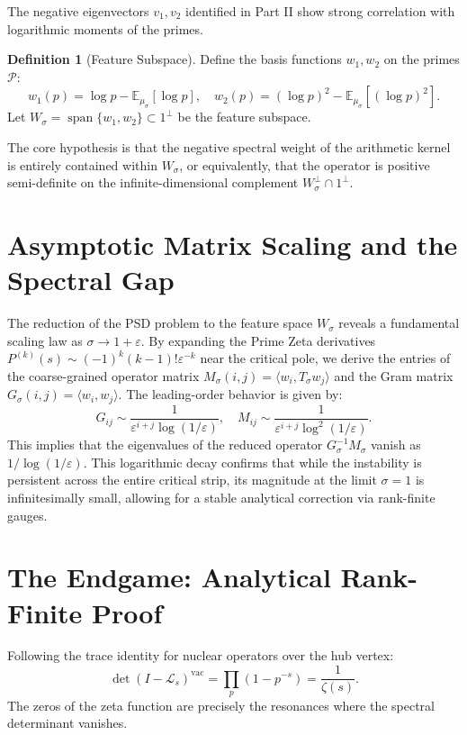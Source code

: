 \documentclass[12pt,a4paper]{article}
\theoremstyle{definition}
\newtheorem{definition}[theorem]{Definition}
\theoremstyle{remark}
\newcommand{\EE}{\mathbb{E}}
\newcommand{\muG}{\mu_\sigma}
\begin{document}
The negative eigenvectors $v_1, v_2$ identified in Part II show strong correlation with logarithmic moments of the primes. 

\begin{definition}[Feature Subspace]
Define the basis functions $w_1, w_2$ on the primes $\mathcal{P}$:
\[ w_1(p) = \log p - \EE_{\muG}[\log p], \quad w_2(p) = (\log p)^2 - \EE_{\muG}[(\log p)^2]. \]
Let $W_\sigma = \operatorname{span}\{w_1, w_2\} \subset 1^\perp$ be the feature subspace.
\end{definition}

The core hypothesis is that the negative spectral weight of the arithmetic kernel is entirely contained within $W_\sigma$, or equivalently, that the operator is positive semi-definite on the infinite-dimensional complement $W_\sigma^\perp \cap 1^\perp$.

\section{Asymptotic Matrix Scaling and the Spectral Gap}

The reduction of the PSD problem to the feature space $W_\sigma$ reveals a fundamental scaling law as $\sigma \to 1+\varepsilon$. By expanding the Prime Zeta derivatives $P^{(k)}(s) \sim (-1)^k (k-1)! \varepsilon^{-k}$ near the critical pole, we derive the entries of the coarse-grained operator matrix $M_\sigma(i,j) = \langle w_i, T_\sigma w_j \rangle$ and the Gram matrix $G_\sigma(i,j) = \langle w_i, w_j \rangle$. The leading-order behavior is given by:
\[ G_{ij} \sim \frac{1}{\varepsilon^{i+j} \log(1/\varepsilon)}, \quad M_{ij} \sim \frac{1}{\varepsilon^{i+j} \log^2(1/\varepsilon)}. \]
This implies that the eigenvalues of the reduced operator $G_\sigma^{-1} M_\sigma$ vanish as $1/\log(1/\varepsilon)$. This logarithmic decay confirms that while the instability is persistent across the entire critical strip, its magnitude at the limit $\sigma=1$ is infinitesimally small, allowing for a stable analytical correction via rank-finite gauges.

\section{The Endgame: Analytical Rank-Finite Proof}

Following the trace identity \cite{Ruelle1976} for nuclear operators over the hub vertex:
\[ \det(I - \mathcal{L}_s)^{\text{vac}} = \prod_p \left(1 - p^{-s}\right) = \frac{1}{\zeta(s)}. \]
The zeros of the zeta function are precisely the resonances where the spectral determinant vanishes.
\end{document}
